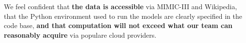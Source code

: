 \documentclass[
	letterpaper, %
]{jdf}
\begin{document}
We feel confident that \textbf{the data is accessible} via MIMIC-III and Wikipedia, that the Python environment used to run the models are clearly specified in the code base, \textbf{and that computation will not exceed what our team can reasonably acquire} via populare cloud providers.

\printbibliography{}
\end{document}
